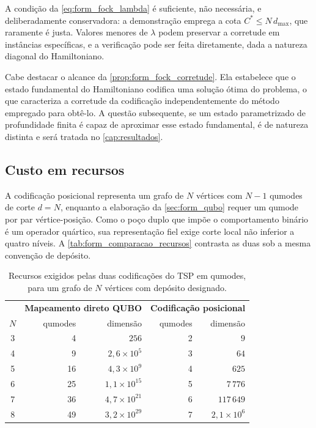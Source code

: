         \bigskip

        A condição da \autoref{eq:form_fock_lambda} é suficiente, não necessária, e deliberadamente conservadora: a demonstração emprega a cota $C^\ast \leq N\,d_{\max}$, que raramente é justa. Valores menores de $\lambda$ podem preservar a corretude em instâncias específicas, e a verificação pode ser feita diretamente, dada a natureza diagonal do Hamiltoniano.

        Cabe destacar o alcance da \autoref{prop:form_fock_corretude}. Ela estabelece que o estado fundamental do Hamiltoniano codifica uma solução ótima do problema, o que caracteriza a corretude da codificação independentemente do método empregado para obtê-lo. A questão subsequente, se um estado parametrizado de profundidade finita é capaz de aproximar esse estado fundamental, é de natureza distinta e será tratada no \autoref{cap:resultados}.

    \subsection{Custo em recursos}\label{subsec:form_fock_recursos}

        A codificação posicional representa um grafo de $N$ vértices com $N-1$ qumodes de corte $d = N$, enquanto a elaboração da \autoref{sec:form_qubo} requer um qumode por par vértice-posição. Como o poço duplo que impõe o comportamento binário é um operador quártico, sua representação fiel exige corte local não inferior a quatro níveis. A \autoref{tab:form_comparacao_recursos} contrasta as duas sob a mesma convenção de depósito.

        \begin{table}[!htb]
        \centering
        \caption{Recursos exigidos pelas duas codificações do TSP em qumodes, para um grafo de $N$ vértices com depósito designado.}
        \label{tab:form_comparacao_recursos}
        \begin{tabular}{crrrr}
        \hline
        & \multicolumn{2}{c}{\textbf{Mapeamento direto QUBO}} & \multicolumn{2}{c}{\textbf{Codificação posicional}} \\
        $N$ & qumodes & dimensão & qumodes & dimensão \\
        \hline
        3 & 4  & $256$                  & 2 & $9$ \\
        4 & 9  & $2{,}6 \times 10^{5}$  & 3 & $64$ \\
        5 & 16 & $4{,}3 \times 10^{9}$  & 4 & $625$ \\
        6 & 25 & $1{,}1 \times 10^{15}$ & 5 & $7\,776$ \\
        7 & 36 & $4{,}7 \times 10^{21}$ & 6 & $117\,649$ \\
        8 & 49 & $3{,}2 \times 10^{29}$ & 7 & $2{,}1 \times 10^{6}$ \\
        \hline
        \end{tabular}
        \end{table}

